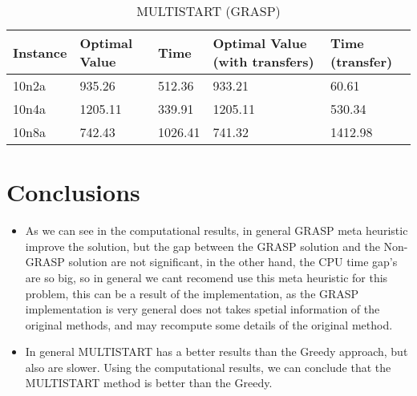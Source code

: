 \documentclass[10pt,twoside]{article}
\begin{document}
\begin{table}[H]
\caption{MULTISTART (GRASP)}
\begin{tabular}{lllll}
  \hline
  Instance & Optimal Value & Time   & Optimal Value (with transfers) & Time (transfer) \\
  \hline
  10n2a    & 935.26        & 512.36 & 933.21                         & 60.61  \\
  10n4a    & 1205.11       & 339.91 & 1205.11                        & 530.34 \\
  10n8a    & 742.43        & 1026.41& 741.32                         & 1412.98\\
  \hline
\end{tabular}
\end{table}

\section{Conclusions}\label{sec_conclusions}
\begin{itemize}
\item As we can see in the computational results, in general GRASP meta heuristic
  improve the solution, but the gap between the GRASP solution and the Non-GRASP
  solution are not significant, in the other hand, the CPU time gap's are so big,
  so in general we cant recomend use this meta heuristic for this problem, this
  can be a result of the implementation, as the GRASP implementation is very
  general does not takes spetial information of the original methods, and may
  recompute some details of the original method.

\item In general MULTISTART has a better results than the Greedy approach, but
  also are slower. Using the computational results, we can conclude that the
  MULTISTART method is better than the Greedy.
\end{itemize}

\newpage
{\small

{\nocite{*}}}
\end{document}
